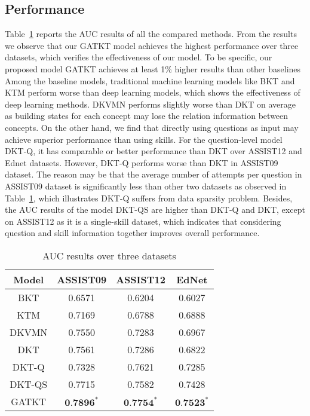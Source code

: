 \subsection{Performance}
Table~\ref{ch2-tb2} reports the AUC results of all the compared methods. From the results we observe that our GATKT model achieves the highest performance over three datasets, which verifies the effectiveness of our model. To be specific, our proposed model GATKT achieves at least 1\% higher results than other baselines Among the baseline models, traditional machine learning models like BKT and KTM perform worse than deep learning models, which shows the effectiveness of deep learning methods. DKVMN performs slightly worse than DKT on average as building states for each concept may lose the relation information between concepts. On the other hand, we find that directly using questions as input may achieve superior performance than using skills. For the question-level model DKT-Q, it has comparable or better performance than DKT over ASSIST12 and Ednet datasets. However, DKT-Q performs worse than DKT in ASSIST09 dataset. The reason may be that the average number of attempts per question in ASSIST09 dataset is significantly less than other two datasets as observed in Table~\ref{ch2-tb2}, which illustrates DKT-Q suffers from data sparsity problem. Besides, the AUC results of the model DKT-QS are higher than DKT-Q and DKT, except on ASSIST12 as it is a single-skill dataset, which indicates that considering question and skill information together improves overall performance.

\begin{table}[h]
	\centering
	\caption{AUC results over three datasets}\label{ch2-tb2}
	\begin{tabular}{cccc}
		\hline Model & ASSIST09                     & ASSIST12                     & EdNet                        \\
		\hline BKT   & 0.6571                       & 0.6204                       & 0.6027                       \\
		KTM          & 0.7169                       & 0.6788                       & 0.6888                       \\
		DKVMN        & 0.7550                       & 0.7283                       & 0.6967                       \\
		DKT          & 0.7561                       & 0.7286                       & 0.6822                       \\
		\hline DKT-Q & 0.7328                       & 0.7621                       & 0.7285                       \\
		DKT-QS       & 0.7715                       & 0.7582                       & 0.7428                       \\
		\hline GATKT & \(\mathbf{0 . 7 8 9 6}^{*}\) & \(\mathbf{0 . 7 7 5 4}^{*}\) & \(\mathbf{0 . 7 5 2 3}^{*}\) \\
		\hline
	\end{tabular}
\end{table}



